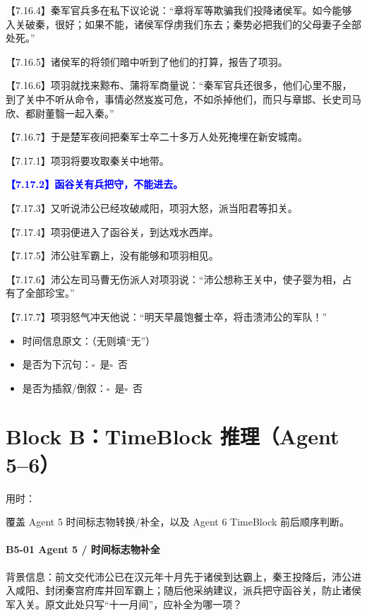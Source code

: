 \documentclass[fontset=none,11pt,a4paper]{ctexart}
\newcommand{\answerline}[1]{\underline{\hspace{#1}}}
\newcommand{\choicebox}[1]{$\square$~#1}
\newcommand{\blocktime}{\vspace{0.25em}\noindent 用时：\answerline{4cm}\par\vspace{0.6em}}
\begin{document}
\noindent 【7.16.4】秦军官兵多在私下议论说：“章将军等欺骗我们投降诸侯军。如今能够入关破秦，很好；如果不能，诸侯军俘虏我们东去；秦势必把我们的父母妻子全部处死。”\par
\noindent 【7.16.5】诸侯军的将领们暗中听到了他们的打算，报告了项羽。\par
\noindent 【7.16.6】项羽就找来黥布、蒲将军商量说：“秦军官兵还很多，他们心里不服，到了关中不听从命令，事情必然岌岌可危，不如杀掉他们，而只与章邯、长史司马欣、都尉董翳一起入秦。”\par
\noindent 【7.16.7】于是楚军夜间把秦军士卒二十多万人处死掩埋在新安城南。\par
\noindent 【7.17.1】项羽将要攻取秦关中地带。\par
\noindent \textcolor{blue}{\textbf{【7.17.2】函谷关有兵把守，不能进去。}}\par
\noindent 【7.17.3】又听说沛公已经攻破咸阳，项羽大怒，派当阳君等扣关。\par
\noindent 【7.17.4】项羽便进入了函谷关，到达戏水西岸。\par
\noindent 【7.17.5】沛公驻军霸上，没有能够和项羽相见。\par
\noindent 【7.17.6】沛公左司马曹无伤派人对项羽说：“沛公想称王关中，使子婴为相，占有了全部珍宝。”\par
\noindent 【7.17.7】项羽怒气冲天他说：“明天早晨饱餐士卒，将击溃沛公的军队！”\par

\begin{itemize}
  \item 时间信息原文：\answerline{7.5cm}（无则填“无”）
  \item 是否为下沉句：\choicebox{是}\quad \choicebox{否}
  \item 是否为插叙/倒叙：\choicebox{是}\quad \choicebox{否}
\end{itemize}


\newpage
\section{Block B：TimeBlock 推理（Agent 5--6）}
\blocktime
覆盖 Agent 5 时间标志物转换/补全，以及 Agent 6 TimeBlock 前后顺序判断。

\paragraph{B5-01 \quad Agent 5 / 时间标志物补全}
背景信息：前文交代沛公已在汉元年十月先于诸侯到达霸上，秦王投降后，沛公进入咸阳、封闭秦宫府库并回军霸上；随后他采纳建议，派兵把守函谷关，防止诸侯军入关。原文此处只写“十一月间”，应补全为哪一项？
\end{document}
